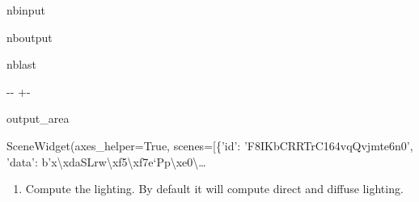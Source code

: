 \documentclass[letterpaper,10pt,english]{sphinxmanual}
\begin{document}
\begin{sphinxuseclass}{nbinput}
{
\begin{sphinxVerbatim}[commandchars=\\\{\}]
\llap{\color{nbsphinxin}[5]:\,\hspace{\fboxrule}\hspace{\fboxsep}}       
\end{sphinxVerbatim}
}

\end{sphinxuseclass}
\begin{sphinxuseclass}{nboutput}
\begin{sphinxuseclass}{nblast}
{

\kern-\sphinxverbatimsmallskipamount\kern-\baselineskip
\kern+\FrameHeightAdjust\kern-\fboxrule
\vspace{\nbsphinxcodecellspacing}

\begin{sphinxuseclass}{output_area}
\begin{sphinxuseclass}{}


\begin{sphinxVerbatim}[commandchars=\\\{\}]
\llap{\color{nbsphinxout}[5]:\,\hspace{\fboxrule}\hspace{\fboxsep}}SceneWidget(axes\_helper=True, scenes=[\{'id': 'F8IKbCRRTrC164vqQvjmte6n0', 'data': b'x\textbackslash{}xdaSLrw\textbackslash{}xf5\textbackslash{}xf7e`Pp\textbackslash{}xe0\textbackslash{}…
\end{sphinxVerbatim}



\end{sphinxuseclass}
\end{sphinxuseclass}
}

\end{sphinxuseclass}
\end{sphinxuseclass}\begin{enumerate}
%
\setcounter{enumi}{2}
\item {} 
\sphinxAtStartPar
Compute the lighting. By default it will compute direct and diffuse lighting.

\end{enumerate}
\end{document}
